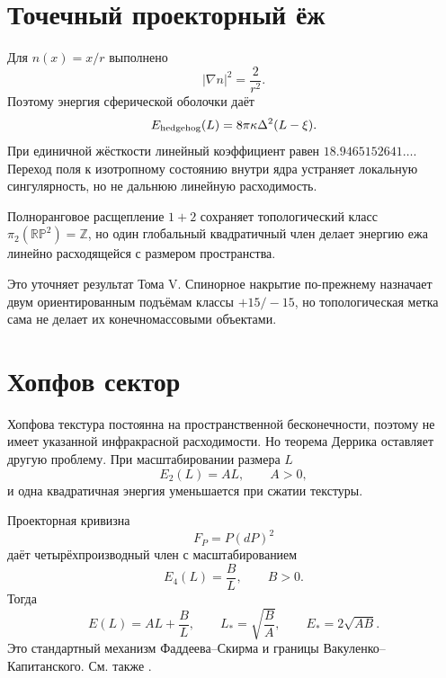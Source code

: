 \section{Точечный проекторный ёж}

Для $n(x)=x/r$ выполнено
\begin{equation}
 |\nabla n|^2=\frac2{r^2}.
\end{equation}
Поэтому энергия сферической оболочки даёт
\begin{equation}
 E_{\rm hedgehog}(L)
 =8\pi\kappa\Delta^2(L-\xi).
 \label{eq:v6-global-hedgehog-linear-energy}
\end{equation}
При единичной жёсткости линейный коэффициент равен
$18.9465152641\ldots$. Переход поля к изотропному состоянию внутри ядра
устраняет локальную сингулярность, но не дальнюю линейную расходимость.

\begin{theorem}
Полноранговое расщепление $1+2$ сохраняет топологический класс
$\pi_2(\mathbb{RP}^2)=\mathbb Z$, но один глобальный квадратичный член
делает энергию ежа линейно расходящейся с размером пространства.
\end{theorem}

Это уточняет результат Тома V. Спинорное накрытие по-прежнему назначает двум
ориентированным подъёмам классы $+15/-15$, но топологическая метка сама не
делает их конечномассовыми объектами.

\section{Хопфов сектор}

Хопфова текстура постоянна на пространственной бесконечности, поэтому не
имеет указанной инфракрасной расходимости. Но теорема Деррика оставляет
другую проблему. При масштабировании размера $L$
\begin{equation}
 E_2(L)=AL,
 \qquad A>0,
\end{equation}
и одна квадратичная энергия уменьшается при сжатии текстуры.

Проекторная кривизна
\begin{equation}
 F_P=P(dP)^2
\end{equation}
даёт четырёхпроизводный член с масштабированием
\begin{equation}
 E_4(L)=\frac BL,
 \qquad B>0.
\end{equation}
Тогда
\begin{equation}
 E(L)=AL+\frac BL,
 \qquad
 L_*=\sqrt{\frac BA},
 \qquad
 E_*=2\sqrt{AB}.
 \label{eq:v6-hopf-derrick-balance}
\end{equation}
Это стандартный механизм Фаддеева--Скирма и границы
Вакуленко--Капитанского. См. также
.

